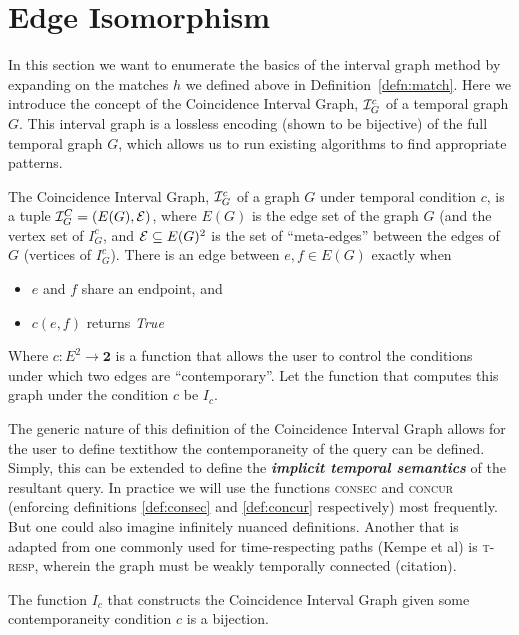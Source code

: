 \section{Edge Isomorphism}

In this section we want to enumerate the basics of the interval graph
method by expanding on the matches $h$ we defined above in
Definition~\ref{defn:match}. Here we introduce the concept of the
Coincidence Interval Graph, $\mathcal{I}_G^c$ of a temporal graph $G$. This
interval graph is a lossless encoding (shown to be bijective) of the
full temporal graph $G$, which allows us to run existing algorithms to
find appropriate patterns.

\begin{defn}
  The Coincidence Interval Graph, $\mathcal{I}_G^c$ of a graph $G$ under
  temporal condition $c$, is a tuple $\mathcal{I}_G^C = (E(G), \mathcal{E})$, where
  $E(G)$ is the edge set of the graph $G$ (and the vertex set of
  $I_G^c$, and $\mathcal{E} \subseteq E(G)^2$ is the set of ``meta-edges'' between the edges of
  $G$ (vertices of $I_G^c$). There is an edge between $e,f \in E(G)$
  exactly when
  \begin{itemize}
    \item $e$ and $f$ share an endpoint, and
    \item $c(e,f)$ returns \emph{True}
  \end{itemize}

  Where $c: E^2 \to \textbf{2}$ is a function that allows the user to
  control the conditions under which two edges are ``contemporary''.
  Let the function that computes this graph under the condition $c$ be $I_c$.
\end{defn}

The generic nature of this definition of the Coincidence Interval
Graph allows for the user to define textit{how} the contemporaneity of
the query can be defined. Simply, this can be extended to define the
\textit{\bf implicit temporal semantics} of the resultant query. In
practice we will use the functions \textsc{consec} and \textsc{concur}
(enforcing definitions \ref{def:consec} and \ref{def:concur}
respectively) most frequently. But one could also imagine infinitely
nuanced definitions. Another that is adapted from one commonly used
for time-respecting paths (Kempe et al) is \textsc{t-resp}, wherein
the graph must be weakly temporally connected (citation).

\begin{lemma}
  \label{lem:ci_biject}
  The function $I_c$ that constructs the Coincidence Interval Graph
  given some contemporaneity condition $c$ is a bijection.
\end{lemma}

